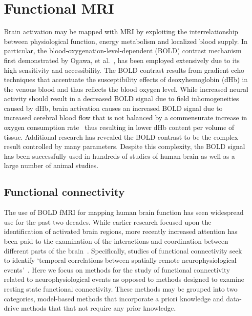 \section{Functional MRI}
Brain activation may be mapped with MRI by exploiting the interrelationship between physiological function, energy metabolism and localized blood supply. In particular, the blood-oxygenation-level-dependent (BOLD) contrast mechanism first demonstrated by Ogawa, et al.~\cite{Ogawa1990}, has been employed extensively due to its high sensitivity and accessibility. The BOLD contrast results from gradient echo techniques that accentuate the susceptibility effects of deoxyhemoglobin (dHb) in the venous blood and thus reflects the blood oxygen level. While increased neural activity should result in a decreased BOLD signal due to field inhomogeneities caused by dHb, brain activation causes an increased BOLD signal due to increased cerebral blood flow that is not balanced by a commensurate increase in oxygen consumption rate~\cite{Fox1986} thus resulting in lower dHb content per volume of tissue. Additional research has revealed the BOLD contrast to be the complex result controlled by many parameters. Despite this complexity, the BOLD signal has been successfully used in hundreds of studies of human brain as well as a large number of animal studies.

\subsection{Functional connectivity}
The use of BOLD fMRI for mapping human brain function has seen widespread use for the past two decades. While earlier research focused upon the identification of activated brain regions, more recently increased attention has been paid to the examination of the interactions and coordination between different parts of the brain~\cite{Fox2005,Greicius2003,Munk2002}. Specifically, studies of functional connectivity seek to identify `temporal correlations between spatially remote neurophysiological events'~\cite{Friston1993,Lee2003}. Here we focus on methods for the study of functional connectivity related to neurophysiological events as opposed to methods designed to examine resting state functional connectivity. These methods may be grouped into two categories, model-based methods that incorporate a priori knowledge and data-drive methods that that not require any prior knowledge.

